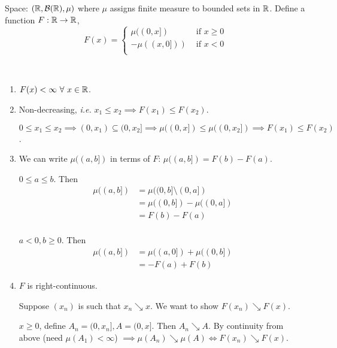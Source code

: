 \documentclass[class=article,crop=false]{standalone}
\begin{document}
\begin{eg}[]
	Space: $ (\mathbb{R}, \mathcal{B}(\mathbb{R}), \mu)$ where $ \mu$ assigns finite measure to bounded sets in $ \mathbb{R}$. Define a function $ F: \mathbb{R} \to \mathbb{R}$,
	\begin{equation*}
		F(x)=
	\begin{cases}
		\mu((0,x]) &\text{ if } x\geq 0\\
		-\mu((x,0])) & \text{ if } x<0\\ 
	\end{cases}
	\end{equation*}
\end{eg}

\begin{property}
~\begin{enumerate}[label=\arabic*)]
	\item $ F(x)< \infty \ \forall \ x \in \mathbb{R}$.
	\item Non-decreasing, \emph{i.e.} $ x_1 \leq x_2 \implies F(x_1)\leq F(x_2)$.
		\begin{prf}
		\begin{case}[]
			$ 0\leq x_1 \leq x_2 \implies (0,x_1) \subseteq (0,x_2] \implies \mu((0,x])\leq \mu((0,x_2]) \implies F(x_1)\leq F(x_2)$.
		\end{case}
		\end{prf}
	\item We can write $ \mu((a,b])$ in terms of $ F$: $ \mu((a,b])=F(b)-F(a)$. 
		\begin{case}[]
		$ 0\leq a\leq b$. Then
		 \begin{align*}
			 \mu((a,b]) &= \mu((0,b] \setminus (0,a])\\
				    &= \mu((0,b]) - \mu((0,a])\\
				    &= F(b) - F(a) \\
		\end{align*}
		\end{case}
		\begin{case}[]
		$ a<0, b\geq 0$. Then
		 \begin{align*}
			 \mu((a,b])&= \mu((a,0]) + \mu((0,b])\\
				   &=-F(a)+F(b)
		\end{align*}
		\end{case}
	\item $ F$ is right-continuous. 
		\begin{prf}
			Suppose $ (x_n)$ is such that $ x_n \searrow x$. We want to show $ F(x_n) \searrow F(x)$.
			\begin{case}[]
				$ x\geq 0$, define  $ A_n=(0,x_n], A=(0,x]$. Then $ A_n \searrow A$. By continuity from above (need $ \mu(A_1) < \infty$) $ \implies \mu(A_n) \searrow \mu(A) \iff F(x_n) \searrow F(x)$.
			\end{case}
		\end{prf}
\end{enumerate}
\end{property}
\end{document}
